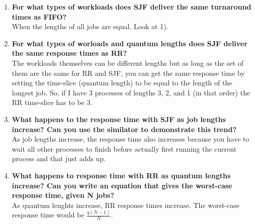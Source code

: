 \documentclass{article}
\begin{document}
\begin{enumerate}
    \item \textbf{For what types of workloads does SJF deliver the same turnaround times as FIFO?} \\
            When the lengths of all jobs are equal. Look at 1).

    \item \textbf{For what types of worloads and quantum lengths does SJF deliver the same response times as RR?} \\
            The workloads themselves can be different lengths but as long as the set of them are the same for RR and SJF, you can get the same response time by setting the time-slice (quantum length) to be equal to the length of the longest job. So, if I have 3 processes of lengths 3, 2, and 1 (in that order) the RR time-slice has to be 3. 

    \item \textbf{What happens to the response time with SJF as job lengths increase? Can you use the similator to demonstrate this trend?}\\
            As job lengths increase, the response time also increases because you have to wait all other processes to finish before actually first running the current process and that just adds up. 

    \item \textbf{What happens to response time with RR as quantum lengths increase? Can you write an equation that gives the worst-case response time, given N jobs?}\\
            As quantum lenghts increase, RR response times increase. The worst-case response time would be $\frac{q(N-1)}{N}$.


\end{enumerate}
\end{document}
